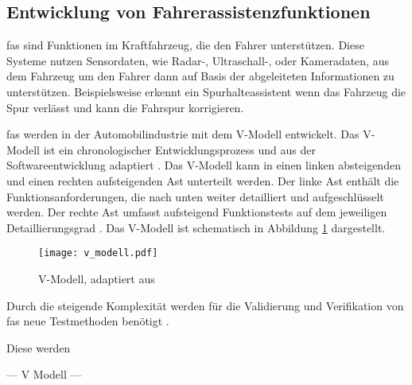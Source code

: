 \subsection{Entwicklung von Fahrerassistenzfunktionen}
\label{grundlagen_fahren_entwicklung}

\gls{fas} sind Funktionen im Kraftfahrzeug, die den Fahrer unterstützen. Diese Systeme nutzen Sensordaten, wie Radar-, Ultraschall-, oder Kameradaten, aus dem Fahrzeug um den Fahrer dann auf Basis der abgeleiteten Informationen zu unterstützen. Beispielsweise erkennt ein Spurhalteassistent wenn das Fahrzeug die Spur verlässt und kann die Fahrspur korrigieren. 

\gls{fas} werden in der Automobilindustrie mit dem V-Modell entwickelt. Das V-Modell ist ein chronologischer Entwicklungsprozess und aus der Softwareentwicklung adaptiert \cite{vmodell2005}. Das V-Modell kann in einen linken absteigenden und einen rechten aufsteigenden Ast unterteilt werden. Der linke Ast enthält die Funktionsanforderungen, die nach unten weiter detailliert und aufgeschlüsselt werden. Der rechte Ast umfasst aufsteigend Funktionstests auf dem jeweiligen Detaillierungsgrad \cite{hakuli2015virtuelle}. Das V-Modell ist schematisch in Abbildung \ref{fig_v_modell} dargestellt.

\begin{figure}[h]
\centering
\texttt{[image: v\_modell.pdf]}
\caption{V-Modell, adaptiert aus \cite{hakuli2015virtuelle}}
\label{fig_v_modell}
\end{figure}

Durch die steigende Komplexität werden für die Validierung und Verifikation von \gls{fas} neue Testmethoden benötigt \cite{tellmann2011hardware}. 

Diese  werden 



--- V Modell --- \cite{hakuli2015virtuelle}



